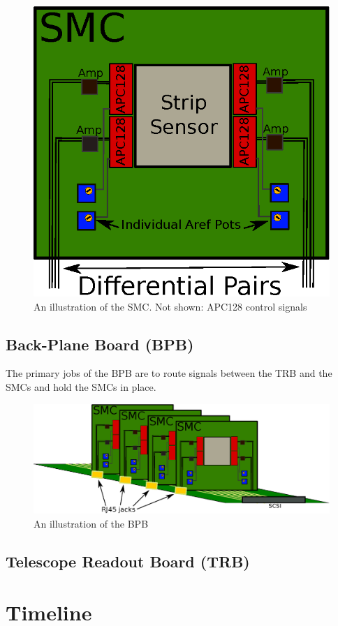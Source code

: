 \documentclass{article}
\begin{document}
\begin{figure}[h!]
  \centering
  \includegraphics{./figures/SMC.eps}
  \caption{An illustration of the SMC. Not shown: APC128 control signals}
  \label{fig:SMC}
\end{figure}


\subsection{Back-Plane Board (BPB)}

The primary jobs of the BPB are to route signals between the TRB and the SMCs and hold the SMCs in place.

\begin{figure}[h!]
  \centering
  \includegraphics{./figures/BPB.eps}
  \caption{An illustration of the BPB}
  \label{fig:PBP}
\end{figure}

\subsection{Telescope Readout Board (TRB)}

\section{Timeline}

\newpage


\end{document}
